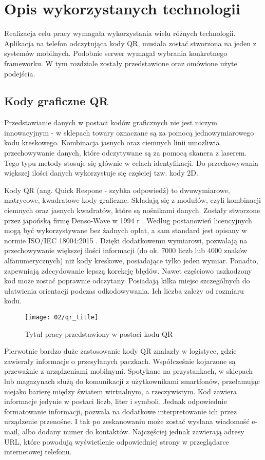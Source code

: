 \section{Opis wykorzystanych technologii}
Realizacja celu pracy wymagała wykorzystania wielu różnych technologii. Aplikacja na telefon odczytująca kody QR, musiała zostać stworzona na jeden z systemów mobilnych. Podobnie serwer wymagał wybrania konkretnego frameworku. W tym rozdziale zostały przedstawione oraz omówione użyte podejścia.

\subsection{Kody graficzne QR}
Przedstawianie danych w postaci kodów graficznych nie jest niczym innowacyjnym - w sklepach towary oznaczane są za pomocą jednowymiarowego kodu kreskowego. Kombinacja jasnych oraz ciemnych linii umożliwia przechowywanie danych, które odczytywane są za pomocą skanera z laserem. Tego typu metody stosuje się głównie w celach identyfikacji. Do przechowywania większej ilości danych wykorzystuje się częściej tzw. kody 2D.

Kody QR (ang. Quick Respone - szybka odpowiedź) to dwuwymiarowe, matrycowe, kwadratowe kody graficzne. Składają się z modułów, czyli kombinacji ciemnych oraz jasnych kwadratów, które są nośnikami danych. Zostały stworzone przez japońską firmę Denso-Wave w 1994 r \cite{thonky_tutorial}. Według postanowień licencyjnych mogą być wykorzystywane bez żadnych opłat, a sam standard jest opisany w normie ISO/IEC 18004:2015 \cite{norma_qr}. Dzięki dodatkowemu wymiarowi, pozwalają na przechowywanie większej ilości informacji (do ok. 7000 liczb lub 4000 znaków alfanumerycznych) niż kody kreskowe, posiadające tylko jeden wymiar. Ponadto, zapewniają zdecydowanie lepszą korekcję błędów. Nawet częściowo uszkodzony kod może zostać poprawnie odczytany. Posiadają kilka miejsc szczególnych do ułatwienia orientacji podczas odkodowywania. Ich liczba zależy od rozmiaru kodu.

\begin{figure}[h]
	\begin{center}
		\texttt{[image: 02/qr\_title]}
	\end{center}
	\caption{Tytuł pracy przedstawiony w postaci kodu QR}
	\vspace{-0.3cm}
\end{figure}

Pierwotnie bardzo duże zastosowanie kody QR znalazły w logistyce, gdzie zawierały informacje o przesyłanych paczkach. Współcześnie kojarzone są przeważnie z urządzeniami mobilnymi. Spotykane na przystankach, w sklepach lub magazynach służą do komunikacji z użytkownikami smartfonów, przełamując niejako barierę między światem wirtualnym, a rzeczywistym. Kod zawiera informacje jedynie w postaci liczb, liter i symboli. Jednak odpowiednie formatowanie informacji, pozwala na dodatkowe interpretowanie ich przez urządzenie przenośne. I tak po zeskanowaniu może zostać wysłana wiadomość e-mail, albo dodany numer do kontaktów. Najczęściej jednak zawierają adresy URL, które powodują wyświetlenie odpowiedniej strony w przeglądarce internetowej telefonu.

